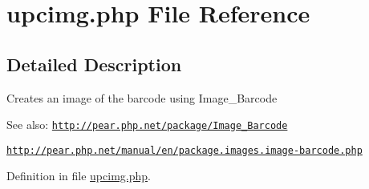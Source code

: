 \hypertarget{upcimg_8php}{
\section{upcimg.php File Reference}
\label{upcimg_8php}
}


\subsection{Detailed Description}
Creates an image of the barcode using Image\_\-Barcode \begin{Desc}
\item[See also:]\href{http://pear.php.net/package/Image_Barcode}{\tt http://pear.php.net/package/Image\_\-Barcode} 

\href{http://pear.php.net/manual/en/package.images.image-barcode.php}{\tt http://pear.php.net/manual/en/package.images.image-barcode.php} \end{Desc}


Definition in file \hyperlink{upcimg_8php-source}{upcimg.php}.